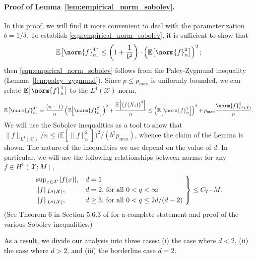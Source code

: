 \documentclass[twoside]{article}
\newcommand{\1}{\mathbf{1}}
\newcommand{\Xset}{\mathcal{X}}
\newcommand{\Leb}{L}
\newcommand{\mc}[1]{\mathcal{#1}}
\theoremstyle{definition}
\theoremstyle{remark}
\begin{document}
\paragraph{Proof of Lemma~\ref{lem:empirical_norm_sobolev}.}
In this proof, we will find it more convenient to deal with the parameterization $b = 1/\delta$. To establish \eqref{eqn:empirical_norm_sobolev}, it is sufficient to show that
\begin{equation*}
\mathbb{E}\bigl[\norm{f}_n^4\bigr] \leq \left(1 + \frac{1}{b^2}\right)\cdot \left(\mathbb{E}\bigl[\norm{f}_n^2\bigr]\right)^2;
\end{equation*}
then \eqref{eqn:empirical_norm_sobolev} follows from the Paley-Zygmund inequality (Lemma~\ref{lem:paley_zygmund}). Since $p \leq p_{\max}$ is uniformly bounded, we can relate $\mathbb{E}\bigl[\norm{f}_n^4\bigr]$ to the $\Leb^4(\Xset)$-norm,
\begin{equation*}
\mathbb{E}\bigl[\norm{f}_n^4\bigr] = \frac{(n-1)}{n}\left(\mathbb{E}\Bigl[\norm{f}_n^2\Bigr]\right)^2 + \frac{\mathbb{E}\Bigl[\bigl(f(X_1)\bigr)^4\Bigr]}{n} \leq \left(\mathbb{E}\Bigl[\norm{f}_n^2\Bigr]\right)^2 + p_{\max}\frac{\norm{f}_{\Leb^4(\Xset)}^4}{n}.
\end{equation*}
We will use the Sobolev inequalities as a tool to show that $\|f\|_{\Leb^4(\Xset)}/n \leq \bigl(\mathbb{E}[\|f\|_n^2]\bigr)^2/(b^2p_{\max})$, whence the claim of the Lemma is shown. The nature of the inequalities we use depend on the value of $d$. In particular, we will use the following relationships between norms: for any $f \in H^1(\mc{X};M)$, 
\begin{equation*}
\begin{rcases*}
\sup_{x \in \mc{X}}|f(x)|,& \textrm{$d = 1$}\\
\|f\|_{\Leb^{q}(\mc{X})},& \textrm{$d = 2$, for all $0 < q < \infty$} \\
\|f\|_{\Leb^{q}(\mc{X})},& \textrm{$d \geq 3$, for all $0 < q \leq 2d/(d - 2)$}
\end{rcases*}
\leq C_7 \cdot M.
\end{equation*}
(See Theorem 6 in Section 5.6.3 of \citet{evans10} for a complete statement and proof of the various Sobolev inequalities.)

As a result, we divide our analysis into three cases: (i) the case where $d < 2$, (ii) the case where $d > 2$, and (iii) the borderline case $d = 2$.
\end{document}
